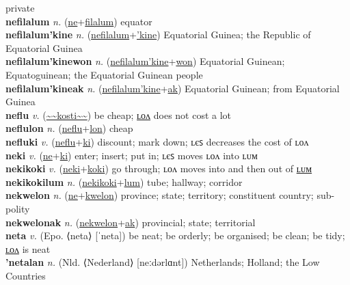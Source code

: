 private \label{nehulon} \\
\textbf{nefilalum} \textit{n.} (\hyperref[ne]{ne}+\hyperref[filalum]{filalum})
equator \label{nefilalum} \\
\textbf{nefilalum'kine} \textit{n.} (\hyperref[nefilalum]{nefilalum}+\hyperref['kine]{'kine})
Equatorial Guinea; the Republic of Equatorial Guinea \label{nefilalum'kine} \\
\textbf{nefilalum'kinewon} \textit{n.} (\hyperref[nefilalum'kine]{nefilalum'kine}+\hyperref[won]{won})
Equatorial Guinean; Equatoguinean; the Equatorial Guinean people \label{nefilalum'kinewon} \\
\textbf{nefilalum'kineak} \textit{n.} (\hyperref[nefilalum'kine]{nefilalum'kine}+\hyperref[ak]{ak})
Equatorial Guinean; from Equatorial Guinea \label{nefilalum'kineak} \\
\textbf{neflu} \textit{v.} (\hyperref[kosti]{\~{}\~{}kosti\~{}\~{}})
be cheap; \hyperref[neflulon]{ʟᴏᴧ} does not cost a lot \label{neflu} \\
\textbf{neflulon} \textit{n.} (\hyperref[neflu]{neflu}+\hyperref[lon]{lon})
cheap \label{neflulon} \\
\textbf{nefluki} \textit{v.} (\hyperref[neflu]{neflu}+\hyperref[ki]{ki})
discount; mark down; ʟєꜱ decreases the cost of ʟᴏᴧ \label{nefluki} \\
\textbf{neki} \textit{v.} (\hyperref[ne]{ne}+\hyperref[ki]{ki})
enter; insert; put in; ʟєꜱ moves ʟᴏᴧ into ʟᴜᴍ \label{neki} \\
\textbf{nekikoki} \textit{v.} (\hyperref[neki]{neki}+\hyperref[koki]{koki})
go through; ʟᴏᴧ moves into and then out of \hyperref[nekikokilum]{ʟᴜᴍ} \label{nekikoki} \\
\textbf{nekikokilum} \textit{n.} (\hyperref[nekikoki]{nekikoki}+\hyperref[lum]{lum})
tube; hallway; corridor \label{nekikokilum} \\
\textbf{nekwelon} \textit{n.} (\hyperref[ne]{ne}+\hyperref[kwelon]{kwelon})
province; state; territory; constituent country; sub-polity \label{nekwelon} \\
\textbf{nekwelonak} \textit{n.} (\hyperref[nekwelon]{nekwelon}+\hyperref[ak]{ak})
provincial; state; territorial \label{nekwelonak} \\
\textbf{neta} \textit{v.} (Epo. ⟨neta⟩ [ˈneta])
be neat; be orderly; be organised; be clean; be tidy; \hyperref[netalon]{ʟᴏᴧ} is neat \label{neta} \\
\textbf{'netalan} \textit{n.} (Nld. ⟨Nederland⟩ [neːdərlɑnt])
Netherlands; Holland; the Low Countries \label{'netalan} \\
